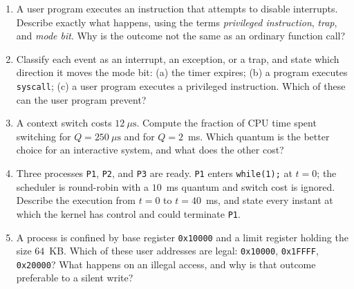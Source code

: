 \documentclass[11pt]{article}
\begin{document}
\begin{enumerate}
  \item A user program executes an instruction that attempts to disable
    interrupts. Describe exactly what happens, using the terms \emph{privileged
    instruction}, \emph{trap}, and \emph{mode bit}. Why is the outcome not the
    same as an ordinary function call?
  \item Classify each event as an interrupt, an exception, or a trap, and state
    which direction it moves the mode bit: (a) the timer expires; (b) a program
    executes \texttt{syscall}; (c) a user program executes a privileged
    instruction. Which of these can the user program prevent?
  \item A context switch costs $12\ \mu\text{s}$. Compute the fraction of CPU
    time spent switching for $Q=250\ \mu\text{s}$ and for $Q=2$~ms. Which
    quantum is the better choice for an interactive system, and what does the
    other cost?
  \item Three processes \texttt{P1}, \texttt{P2}, and \texttt{P3} are ready.
    \texttt{P1} enters \texttt{while(1);} at $t=0$; the scheduler is
    round-robin with a $10$~ms quantum and switch cost is ignored. Describe the
    execution from $t=0$ to $t=40$~ms, and state every instant at which the
    kernel has control and could terminate \texttt{P1}.
  \item A process is confined by base register \texttt{0x10000} and a limit
    register holding the size $64$~KB. Which of these user addresses are legal:
    \texttt{0x10000}, \texttt{0x1FFFF}, \texttt{0x20000}? What happens on an
    illegal access, and why is that outcome preferable to a silent write?
\end{enumerate}
\end{document}
